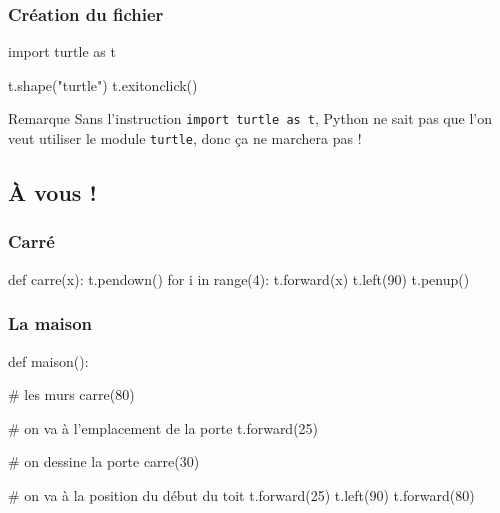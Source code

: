 \documentclass{beamer}
\begin{document}
\begin{frame}[fragile]
   \frametitle{Création du fichier}

   \begin{pyverbatim}
      import turtle as t

      t.shape("turtle")
      t.exitonclick()
   \end{pyverbatim}

   \begin{block}{Remarque}
      Sans l'instruction \texttt{import turtle as t}, Python ne sait pas que l'on veut utiliser le module \texttt{turtle}, donc ça ne marchera pas !
   \end{block}
\end{frame}

   \subsection{À vous !}\label{subsec:a-vous}

\begin{frame}[fragile]
   \frametitle{Carré}

   \begin{pyverbatim}
            def carre(x):
               t.pendown()
               for i in range(4):
                  t.forward(x)
                  t.left(90)
               t.penup()
   \end{pyverbatim}
\end{frame}

\begin{frame}[fragile]
   \frametitle{La maison}

   \begin{pyverbatim}
      def maison():
   \end{pyverbatim}
   \pause
   \begin{pyverbatim}
         # les murs
         carre(80)
   \end{pyverbatim}
   \pause
   \begin{pyverbatim}
         # on va à l'emplacement de la porte
         t.forward(25)
   \end{pyverbatim}
   \pause
   \begin{pyverbatim}
         # on dessine la porte
         carre(30)
   \end{pyverbatim}
   \pause
   \begin{pyverbatim}
         # on va à la position du début du toit
         t.forward(25)
         t.left(90)
         t.forward(80)
   \end{pyverbatim}
\end{frame}
\end{document}
